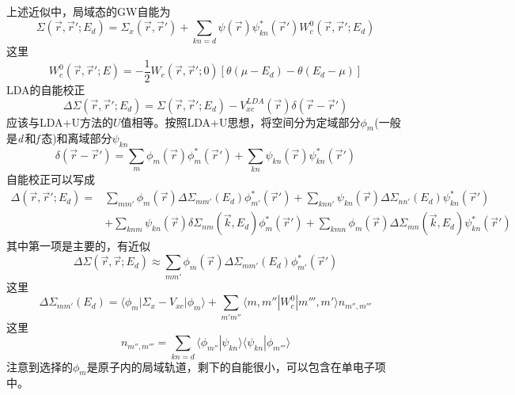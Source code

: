 上述近似中，局域态的GW自能为
\begin{equation}
  \Sigma(\vec r,\vec r';E_d)=\Sigma_x(\vec r,\vec r')+\sum_{kn=d}\psi(\vec r)\psi_{kn}^{\ast}(\vec r')W_c^0(\vec r,\vec r';E_d)
  \label{eq:solid-242}
\end{equation}
这里$$W_c^0(\vec r,\vec r';E)=-\frac12W_c(\vec r,\vec r';0)[\theta(\mu-E_d)-\theta(E_d-\mu)]$$
LDA的自能校正
\begin{equation}
  \Delta\Sigma(\vec r,\vec r';E_d)=\Sigma(\vec r,\vec r';E_d)-V_{xc}^{LDA}(\vec r)\delta(\vec r-\vec r')
  \label{eq:solid-243}
\end{equation}
应该与LDA+U方法的$U$值相等。按照LDA+U思想，将空间分为定域部分$\phi_m$(一般是{\it d}\,和{\it f}\,态)和离域部分$\psi_{kn}$
$$\delta(\vec r-\vec r')=\sum_m\phi_m(\vec r)\phi_m^{\ast}(\vec r')+\sum_{kn}\psi_{kn}(\vec r)\psi_{kn}^{\ast}(\vec r')$$
自能校正可以写成
\begin{equation}
  \begin{split}
    \Delta(\vec r,\vec r';E_d)=&\sum_{mm'}\phi_m(\vec r)\Delta\Sigma_{mm'}(E_d)\phi_{m'}^{\ast}(\vec r')+\sum_{knn'}\psi_{kn}(\vec r)\Delta\Sigma_{nn'}(E_d)\psi_{kn}^{\ast}(\vec r')\\
    &+\sum_{knm}\psi_{kn}(\vec r)\delta\Sigma_{nm}(\vec k,E_d)\phi_m^{\ast}(\vec r')+\sum_{kmn}\phi_m(\vec r)\Delta\Sigma_{mn}(\vec k,E_d)\psi_{kn}^{\ast}(\vec r')
  \end{split}
  \label{eq:solid-244}
\end{equation}
其中第一项是主要的，有近似
$$\Delta\Sigma(\vec r,\vec r;E_d)\approx\sum_{mm'}\phi_m(\vec r)\Delta\Sigma_{mm'}(E_d)\phi_{m'}^{\ast}(\vec r')$$
这里$$\Delta\Sigma_{mm'}(E_d)=\langle\phi_m|\Sigma_x-V_{xc}|\phi_m\rangle+\sum_{m'm''}\langle m,m''|W_c^0|m''',m'\rangle n_{m'',m'''}$$
这里$$n_{m'',m'''}=\sum_{kn=d}\langle\phi_{m''}|\psi_{kn}\rangle\langle\psi_{kn}|\phi_{m'''}\rangle$$
注意到选择的$\phi_m$是原子内的局域轨道，剩下的自能很小，可以包含在单电子项中。

